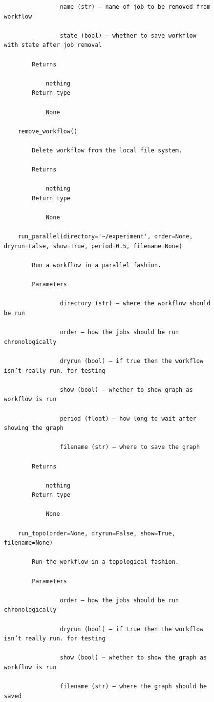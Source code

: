 \begin{figure}[htb]
\begin{verbatim}
                name (str) – name of job to be removed from workflow

                state (bool) – whether to save workflow with state after job removal

        Returns

            nothing
        Return type

            None

    remove_workflow()

        Delete workflow from the local file system.

        Returns

            nothing
        Return type

            None

    run_parallel(directory='~/experiment', order=None, dryrun=False, show=True, period=0.5, filename=None)

        Run a workflow in a parallel fashion.

        Parameters

                directory (str) – where the workflow should be run

                order – how the jobs should be run chronologically

                dryrun (bool) – if true then the workflow isn’t really run. for testing

                show (bool) – whether to show graph as workflow is run

                period (float) – how long to wait after showing the graph

                filename (str) – where to save the graph

        Returns

            nothing
        Return type

            None

    run_topo(order=None, dryrun=False, show=True, filename=None)

        Run the workflow in a topological fashion.

        Parameters

                order – how the jobs should be run chronologically

                dryrun (bool) – if true then the workflow isn’t really run. for testing

                show (bool) – whether to show the graph as workflow is run

                filename (str) – where the graph should be saved


\end{verbatim}
\end{figure}
